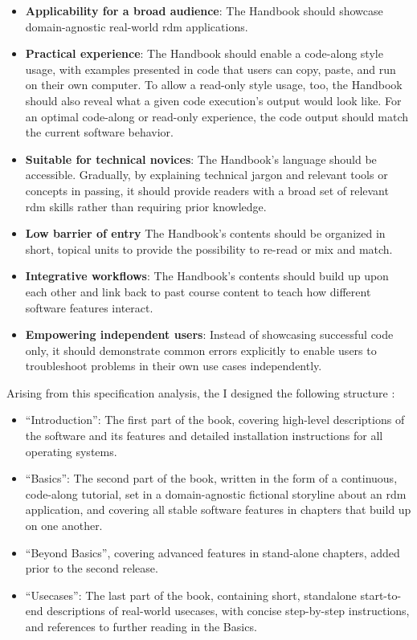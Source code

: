 \begin{itemize}
	\item \textbf{Applicability for a broad audience}: The Handbook should showcase domain-agnostic real-world \gls{rdm} applications.
	\item \textbf{Practical experience}: The Handbook should enable a code-along style usage, with examples presented in code that users can copy, paste, and run on their own computer. To allow a read-only style usage, too, the Handbook should also reveal what a given code execution's output would look like. For an optimal code-along or read-only experience, the code output should match the current software behavior.
	\item \textbf{Suitable for technical novices}: The Handbook's language should be accessible. Gradually, by explaining technical jargon and relevant tools or concepts in passing, it should provide readers with a broad set of relevant \gls{rdm} skills rather than requiring prior knowledge.
	\item \textbf{Low barrier of entry} The Handbook's contents should be organized in short, topical units to provide the possibility to re-read or mix and match.
	\item \textbf{Integrative workflows}: The Handbook's contents should build up upon each other and link back to past course content to teach how different software features interact.
	\item \textbf{Empowering independent users}: Instead of showcasing successful code only, it should demonstrate common errors explicitly to enable users to troubleshoot problems in their own use cases independently.

\end{itemize}

Arising from this specification analysis, the I designed the following structure \citep{wagner_adina_s_2020_7906718}:

\begin{itemize}
	\item ``Introduction'': The first part of the book, covering high-level descriptions of the software and its features and detailed installation instructions for all operating systems.
	\item ``Basics'': The second part of the book, written in the form of a continuous, code-along tutorial, set in a domain-agnostic fictional storyline about an \gls{rdm} application, and covering all stable software features in chapters that build up on one another.
	\item ``Beyond Basics'', covering advanced features in stand-alone chapters, added prior to the second release.
	\item ``Usecases'': The last part of the book, containing short, standalone start-to-end descriptions of real-world usecases, with concise step-by-step instructions, and references to further reading in the Basics.
\end{itemize}

